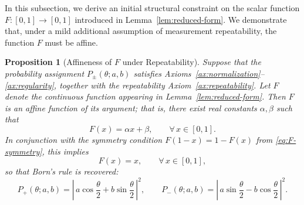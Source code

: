 \documentclass[11pt,a4paper]{article}
\numberwithin{equation}{section}
\newtheorem{proposition}[theorem]{Proposition}
\theoremstyle{definition}
\begin{document}
In this subsection, we derive an initial structural constraint on the scalar function
$F:[0,1]\to[0,1]$ introduced in Lemma~\ref{lem:reduced-form}. We demonstrate that, under a mild additional assumption of measurement repeatability, the function $F$ must be affine.

\begin{proposition}[Affineness of $F$ under Repeatability]
\label{prop:affine-F}
Suppose that the probability assignment $P_\pm(\theta;a,b)$ satisfies Axioms~\ref{ax:normalization}--\ref{ax:regularity}, together with the repeatability Axiom~\ref{ax:repeatability}. Let $F$ denote the continuous function appearing in Lemma~\ref{lem:reduced-form}. Then $F$ is an affine function of its argument; that is, there exist real constants $\alpha,\beta$ such that
\begin{equation}
\label{eq:F-affine}
F(x) = \alpha x + \beta,\qquad \forall\,x\in[0,1].
\end{equation}
In conjunction with the symmetry condition $F(1-x)=1-F(x)$ from
\eqref{eq:F-symmetry}, this implies
\begin{equation}
\label{eq:F-identity}
F(x) = x,\qquad \forall\,x\in[0,1],
\end{equation}
so that Born’s rule is recovered:
\[
P_+(\theta;a,b)
=
\left|\,a\cos\frac{\theta}{2} + b\sin\frac{\theta}{2}\,\right|^2,
\qquad
P_-(\theta;a,b)
=
\left|\,a\sin\frac{\theta}{2} - b\cos\frac{\theta}{2}\,\right|^2.
\]
\end{proposition}
\end{document}

